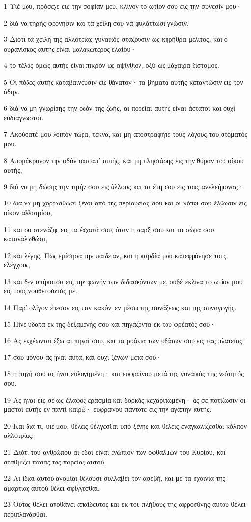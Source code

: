 \par 1 Υιέ μου, πρόσεχε εις την σοφίαν μου, κλίνον το ωτίον σου εις την σύνεσίν μου·
\par 2 διά να τηρής φρόνησιν και τα χείλη σου να φυλάττωσι γνώσιν.
\par 3 Διότι τα χείλη της αλλοτρίας γυναικός στάζουσιν ως κηρήθρα μέλιτος, και ο ουρανίσκος αυτής είναι μαλακώτερος ελαίου·
\par 4 το τέλος όμως αυτής είναι πικρόν ως αψίνθιον, οξύ ως μάχαιρα δίστομος.
\par 5 Οι πόδες αυτής καταβαίνουσιν εις θάνατον· τα βήματα αυτής καταντώσιν εις τον άδην.
\par 6 διά να μη γνωρίσης την οδόν της ζωής, αι πορείαι αυτής είναι άστατοι και ουχί ευδιάγνωστοι.
\par 7 Ακούσατέ μου λοιπόν τώρα, τέκνα, και μη αποστραφήτε τους λόγους του στόματός μου.
\par 8 Απομάκρυνον την οδόν σου απ' αυτής, και μη πλησιάσης εις την θύραν του οίκου αυτής,
\par 9 διά να μη δώσης την τιμήν σου εις άλλους και τα έτη σου εις τους ανελεήμονας·
\par 10 διά να μη χορτασθώσι ξένοι από της περιουσίας σου και οι κόποι σου έλθωσιν εις οίκον αλλοτρίου,
\par 11 και συ στενάζης εις τα έσχατά σου, όταν η σαρξ σου και το σώμα σου καταναλωθώσι,
\par 12 και λέγης, Πως εμίσησα την παιδείαν, και η καρδία μου κατεφρόνησε τους ελέγχους,
\par 13 και δεν υπήκουσα εις την φωνήν των διδασκόντων με, ουδέ έκλινα το ωτίον μου εις τους νουθετούντάς με.
\par 14 Παρ' ολίγον έπεσον εις παν κακόν, εν μέσω της συνάξεως και της συναγωγής.
\par 15 Πίνε ύδατα εκ της δεξαμενής σου και πηγάζοντα εκ του φρέατός σου·
\par 16 Ας εκχέωνται έξω αι πηγαί σου, και τα ρυάκια των υδάτων σου εις τας πλατείας·
\par 17 σου μόνου ας ήναι αυτά, και ουχί ξένων μετά σού·
\par 18 η πηγή σου ας ήναι ευλογημένη· και ευφραίνου μετά της γυναικός της νεότητός σου.
\par 19 Ας ήναι εις σε ως έλαφος ερασμία και δορκάς κεχαριτωμένη· ας σε ποτίζωσιν οι μαστοί αυτής εν παντί καιρώ· ευφραίνου πάντοτε εις την αγάπην αυτής.
\par 20 Και διά τι, υιέ μου, θέλεις θέλγεσθαι υπό ξένης και θέλεις εναγκαλίζεσθαι κόλπον αλλοτρίας;
\par 21 Διότι του ανθρώπου αι οδοί είναι ενώπιον των οφθαλμών του Κυρίου, και σταθμίζει πάσας τας πορείας αυτού.
\par 22 Αι ίδιαι αυτού ανομίαι θέλουσι συλλάβει τον ασεβή, και με τα σχοινία της αμαρτίας αυτού θέλει σφίγγεσθαι.
\par 23 Ούτος θέλει αποθάνει απαίδευτος και εκ του πλήθους της αφροσύνης αυτού θέλει περιπλανάσθαι.

